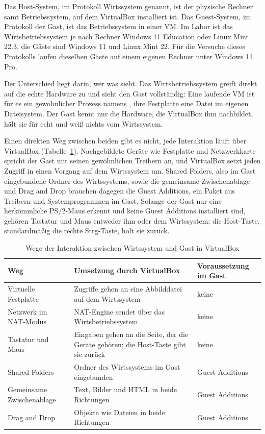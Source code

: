 Das Host-System, im Protokoll Wirtssystem genannt, ist der physische Rechner samt Betriebssystem, auf dem VirtualBox installiert ist. Das Guest-System, im Protokoll der Gast, ist das Betriebssystem in einer VM. Im Labor ist das Wirtsbetriebssystem je nach Rechner Windows 11 Education oder Linux Mint 22.3, die Gäste sind Windows 11 und Linux Mint 22. Für die Versuche dieses Protokolls laufen dieselben Gäste auf einem eigenen Rechner unter Windows 11 Pro.

Der Unterschied liegt darin, wer was sieht. Das Wirtsbetriebssystem greift direkt auf die echte Hardware zu und sieht den Gast vollständig: Eine laufende VM ist für es ein gewöhnlicher Prozess namens , ihre Festplatte eine Datei im eigenen Dateisystem. Der Gast kennt nur die Hardware, die VirtualBox ihm nachbildet, hält sie für echt und weiß nichts vom Wirtssystem.

Einen direkten Weg zwischen beiden gibt es nicht, jede Interaktion läuft über VirtualBox (Tabelle~\ref{tab:hostgast}). Nachgebildete Geräte wie Festplatte und Netzwerkkarte spricht der Gast mit seinen gewöhnlichen Treibern an, und VirtualBox setzt jeden Zugriff in einen Vorgang auf dem Wirtssystem um. Shared Folders, also im Gast eingebundene Ordner des Wirtssystems, sowie die gemeinsame Zwischenablage und Drag and Drop brauchen dagegen die Guest Additions, ein Paket aus Treibern und Systemprogrammen im Gast. Solange der Gast nur eine herkömmliche PS/2-Maus erkennt und keine Guest Additions installiert sind, gehören Tastatur und Maus entweder ihm oder dem Wirtssystem; die Host-Taste, standardmäßig die rechte Strg-Taste, holt sie zurück.

\begin{table}[H]
\centering
\caption{Wege der Interaktion zwischen Wirtssystem und Gast in VirtualBox}
\label{tab:hostgast}
\begin{tabularx}{\textwidth}{@{}lXl@{}}
\toprule
\textbf{Weg} & \textbf{Umsetzung durch VirtualBox} & \textbf{Voraussetzung im Gast} \\
\midrule
Virtuelle Festplatte & Zugriffe gehen an eine Abbilddatei auf dem Wirtssystem & keine \\
Netzwerk im NAT-Modus & NAT-Engine sendet über das Wirtsbetriebssystem & keine \\
Tastatur und Maus & Eingaben gehen an die Seite, der die Geräte gehören; die Host-Taste gibt sie zurück & keine \\
\addlinespace
Shared Folders & Ordner des Wirtssystems im Gast eingebunden & Guest Additions \\
Gemeinsame Zwischenablage & Text, Bilder und HTML in beide Richtungen & Guest Additions \\
Drag and Drop & Objekte wie Dateien in beide Richtungen & Guest Additions \\
\bottomrule
\end{tabularx}
\end{table}

